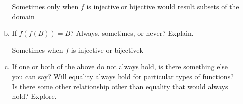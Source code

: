 \documentclass[11pt, a4paper]{article}
\begin{document}
\begin{enumerate}
\begin{enumerate}[(a)]
                Sometimes only when $f$ is injective or bijective would result subsets of the domain

            \item If $f(f(B)) = B$? Always, sometimes, or never? Explain.

                Sometimes when $f$ is injective or bijectivek
            \item If one or both of the above do not always hold, is there something else you can say? Will equality always hold for particular types of functions? Is there some other relationship other than equality that would always hold? Explore.
        \end{enumerate}

    \end{enumerate}
\end{document}

